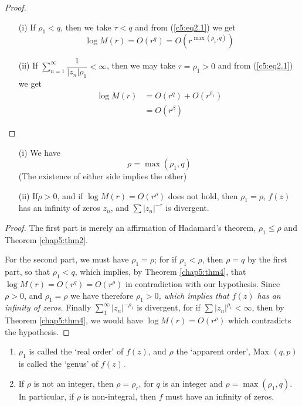 \begin{proof}
\begin{itemize}
\item[{\rm (i)}] If $\rho_1 < q$, then we take $\tau < q$ and from
  (\ref{c5:eq2.1}) we get
$$
\log M(r) = O (r^q) = O (r^{\max (\rho_1, q)})
$$

\item[{\rm (ii)}] If $\sum\limits^\infty_{n=1} \dfrac{1}{|z_n|\rho_1}
  < \infty$, then we may take $\tau = \rho_1 >0$ and from (\ref{c5:eq2.1}) we get
\begin{align*}
\log M(r) & = O(r^q) + O (r^{\rho_1})\\
& = O(r^\beta)
\end{align*}
\end{itemize}
\end{proof}

\begin{thm}\label{chap5:thm5}
\begin{itemize}
\item[{\rm (i)}] We have
$$
\rho = \max (\rho_1, q)
$$
(The existence of either side implies the other)

\item[{\rm (ii)}] If\pageoriginale $\rho > 0$, and if $\log M(r) = O
  (r^\rho)$ does not hold, then $\rho_1 = \rho$, $f(z)$ has an
  infinity of zeros $z_n$, and $\sum |z_n|^{-\tau}$ is divergent.
\end{itemize}
\end{thm}

\begin{proof}
The first part is merely an affirmation of Hadamard's theorem, $\rho_1
\leq \rho$ and Theorem \ref{chap5:thm2}. 

For the second part, we must have $\rho_1 = \rho$; for if
$\rho_1<\rho$, then $\rho = q$ by the first part, so that $\rho_1 <
q$, which implies, by Theorem \ref{chap5:thm4}, that $\log M(r) = O(r^q) = O(r^\rho)$
in contradiction with our hypothesis. Since $\rho>0$, and $\rho_1 =
\rho$ we have therefore \textit{$\rho_1 >0$, which implies that $f(z)$
has an infinity of zeros.} Finally $\sum\limits^\infty_1
|z_n|^{-\rho_1}$ is divergent, for if $\sum |z_n|^{\rho_1} < \infty$,
then by Theorem \ref{chap5:thm4}, we would have $\log M(r) = O (r^\rho)$ which
contradicts the hypothesis.
\end{proof}

\begin{remarks*}
\begin{enumerate}
\renewcommand{\labelenumi}{(\theenumi)}
\item $\rho_1$ is called the `real order' of $f(z)$, and $\rho$ the
  `apparent order', Max $(q,p)$ is called the `genus' of $f(z)$.

\item If $\rho$ is not an integer, then $\rho = \rho_r$, for $q$ is an
  integer and $\rho = \max (\rho_1, q)$. In particular, if $\rho$ is
  non-integral, then $f$ must have an infinity of zeros.

\end{enumerate}
\end{remarks*}
